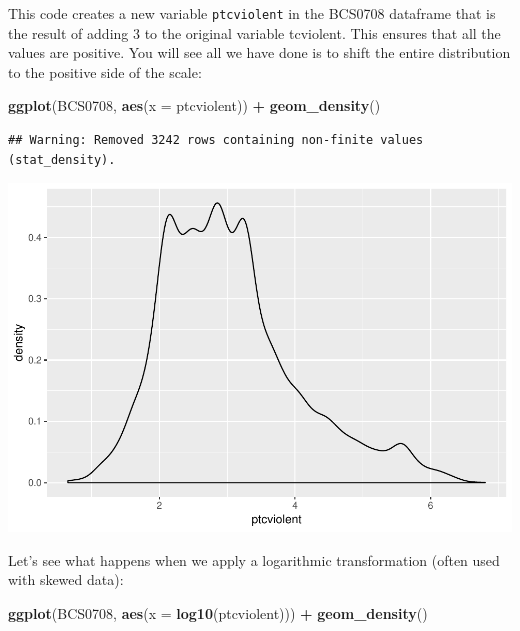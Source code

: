 \documentclass[]{book}
\newenvironment{Shaded}{\begin{snugshade}}{\end{snugshade}}
\newcommand{\DataTypeTok}[1]{\textcolor[rgb]{0.13,0.29,0.53}{#1}}
\newcommand{\DecValTok}[1]{\textcolor[rgb]{0.00,0.00,0.81}{#1}}
\newcommand{\KeywordTok}[1]{\textcolor[rgb]{0.13,0.29,0.53}{\textbf{#1}}}
\newcommand{\NormalTok}[1]{#1}
\newcommand{\OperatorTok}[1]{\textcolor[rgb]{0.81,0.36,0.00}{\textbf{#1}}}
\newcommand{\StringTok}[1]{\textcolor[rgb]{0.31,0.60,0.02}{#1}}
\theoremstyle{definition}
\theoremstyle{definition}
\theoremstyle{definition}
\theoremstyle{remark}
\begin{document}
\begin{Shaded}
\end{Shaded}

This code creates a new variable \texttt{ptcviolent} in the BCS0708
dataframe that is the result of adding 3 to the original variable
tcviolent. This ensures that all the values are positive. You will see
all we have done is to shift the entire distribution to the positive
side of the scale:

\begin{Shaded}
\begin{Highlighting}[]
\KeywordTok{ggplot}\NormalTok{(BCS0708, }\KeywordTok{aes}\NormalTok{(}\DataTypeTok{x =}\NormalTok{ ptcviolent)) }\OperatorTok{+}\StringTok{ }
\StringTok{  }\KeywordTok{geom_density}\NormalTok{()}
\end{Highlighting}
\end{Shaded}

\begin{verbatim}
## Warning: Removed 3242 rows containing non-finite values (stat_density).
\end{verbatim}

\includegraphics{06-hypothesis_testing_files/figure-latex/unnamed-chunk-19-1.pdf}

Let's see what happens when we apply a logarithmic transformation (often
used with skewed data):

\begin{Shaded}
\begin{Highlighting}[]
\KeywordTok{ggplot}\NormalTok{(BCS0708, }\KeywordTok{aes}\NormalTok{(}\DataTypeTok{x =} \KeywordTok{log10}\NormalTok{(ptcviolent))) }\OperatorTok{+}\StringTok{ }
\StringTok{  }\KeywordTok{geom_density}\NormalTok{()}
\end{Highlighting}
\end{Shaded}
\end{document}
